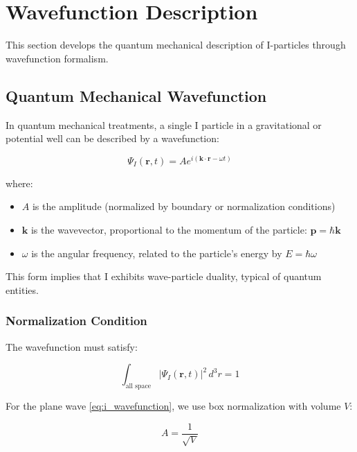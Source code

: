 \section{Wavefunction Description}
\label{sec:wavefunction}

This section develops the quantum mechanical description of I-particles through wavefunction formalism.

\subsection{Quantum Mechanical Wavefunction}
\label{subsec:quantum_wavefunction}

In quantum mechanical treatments, a single I particle in a gravitational or potential well can be described by a wavefunction:

\begin{equation}
\label{eq:i_wavefunction}
\Psi_I(\mathbf{r}, t) = A e^{i(\mathbf{k} \cdot \mathbf{r} - \omega t)}
\end{equation}

where:
\begin{itemize}
    \item $A$ is the amplitude (normalized by boundary or normalization conditions)
    \item $\mathbf{k}$ is the wavevector, proportional to the momentum of the particle: $\mathbf{p} = \hbar\mathbf{k}$
    \item $\omega$ is the angular frequency, related to the particle's energy by $E = \hbar\omega$
\end{itemize}

This form implies that I exhibits wave-particle duality, typical of quantum entities.

\subsubsection{Normalization Condition}

The wavefunction must satisfy:

\begin{equation}
\label{eq:normalization}
\int_{\text{all space}} |\Psi_I(\mathbf{r}, t)|^2 \, d^3r = 1
\end{equation}

For the plane wave \eqref{eq:i_wavefunction}, we use box normalization with volume $V$:

\begin{equation}
\label{eq:box_normalization}
A = \frac{1}{\sqrt{V}}
\end{equation}


